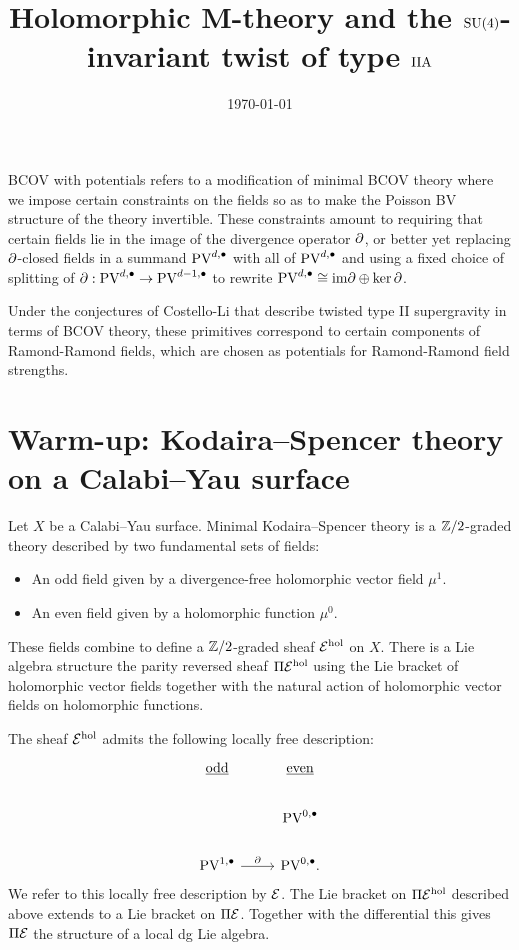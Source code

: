 \documentclass[11pt]{article}
\date{\today}
\title{Holomorphic M-theory and the $\text{SU}(4)$-invariant twist of type $\text{IIA}$ }
\newcommand\bu{\bullet}
\begin{document}
\maketitle

BCOV with potentials refers to a modification of minimal BCOV theory where we impose certain constraints on the fields so as to make the Poisson BV structure of the theory invertible. These constraints amount to requiring that certain fields lie in the image of the divergence operator \(\partial\), or better yet replacing $\partial$-closed fields in a summand \(\text{PV}^{d,\bullet}\) with all of \(\text{PV}^{d,\bullet}\) and using a fixed choice of splitting of \(\partial: \text{PV}^{d,\bullet}\to \text{PV}^{d-1,\bullet}\) to rewrite \(\text{PV}^{d,\bullet}\cong\text{im}\partial\oplus\ker\partial\).

Under the conjectures of Costello-Li that describe twisted type II supergravity in terms of BCOV theory, these primitives correspond to certain components of Ramond-Ramond fields, which are chosen as potentials for Ramond-Ramond field strengths.

\section{Warm-up: Kodaira--Spencer theory on a Calabi--Yau surface}

Let $X$ be a Calabi--Yau surface. 
Minimal Kodaira--Spencer theory is a $\mathbb{Z}/2$-graded theory described by two fundamental sets of fields:
\begin{itemize}
\item An odd field given by a divergence-free holomorphic vector field $\mu^1$. 
\item An even field given by a holomorphic function $\mu^0$.
\end{itemize}
These fields combine to define a $\mathbb{Z}/2$-graded sheaf $\mathcal{E}^{\rm hol}$ on $X$. 
There is a Lie algebra structure the parity reversed sheaf $\Pi \mathcal{E}^{\rm hol}$ using the Lie bracket of holomorphic vector fields together with the natural action of holomorphic vector fields on holomorphic functions. 

The sheaf $\mathcal{E}^{\rm hol}$ admits the following locally free description:
\[
\begin{tikzcd}
\ul{\rm odd} & \ul{\rm even} \\
 & \PV^{0,\bu} \\
 \PV^{1,\bu} \ar[r, "\partial"] & \PV^{0,\bu} .
\end{tikzcd}
\]
We refer to this locally free description by $\mathcal{E}$. 
The Lie bracket on $\Pi \mathcal{E}^{\rm hol}$ described above extends to a Lie bracket on $\Pi \mathcal{E}$.
Together with the differential this gives $\Pi \mathcal{E}$ the structure of a local dg Lie algebra. 
\end{document}
